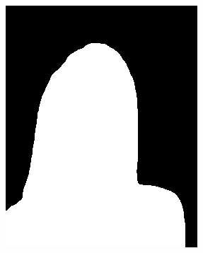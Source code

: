 \documentclass[11pt]{article}
\begin{document}
\begin{figure}[!h]
{\begin{minipage}[t]{0.2\linewidth}
  \includegraphics[width=1\linewidth]{d2.png}
  \end{minipage}%
  }%
\end{figure}
\end{document}
